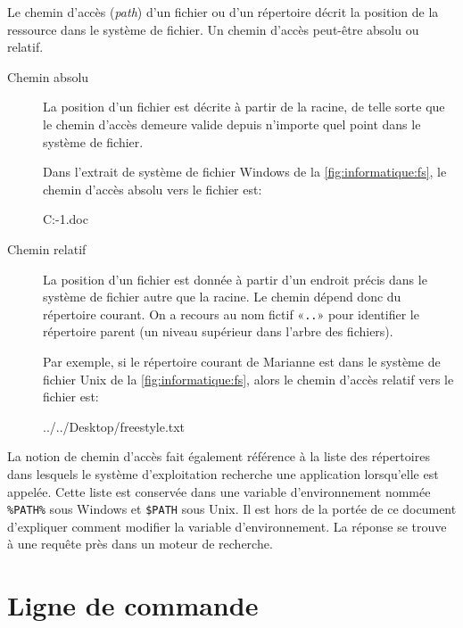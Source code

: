 Le chemin d'accès (\emph{path}) d'un fichier ou
d'un répertoire décrit la position de la ressource dans le système de
fichier. Un chemin d'accès peut-être absolu ou relatif.
\begin{description}
\item[Chemin absolu]  La position d'un
  fichier est décrite à partir de la racine, de telle sorte que le
  chemin d'accès demeure valide depuis n'importe quel point dans le
  système de fichier.

  Dans l'extrait de système de fichier Windows de la
  \autoref{fig:informatique:fs}, le chemin d'accès absolu vers le
  fichier  est:
\begin{Schunk}
\begin{Sinput}
C:\Users\Alexandre\Documents\synthese-1.doc
\end{Sinput}
\end{Schunk}
\item[Chemin relatif]  La position d'un
  fichier est donnée à partir d'un endroit précis dans le système de
  fichier autre que la racine. Le chemin dépend donc du répertoire
  courant. On a recours au nom fictif «\verb=..=» pour identifier le
  répertoire parent (un niveau supérieur dans l'arbre des fichiers).

  Par exemple, si le répertoire courant de Marianne est
   dans le système de fichier Unix de la
  \autoref{fig:informatique:fs}, alors le chemin d'accès relatif vers
  le fichier  est:
\begin{Schunk}
\begin{Sinput}
../../Desktop/freestyle.txt
\end{Sinput}
\end{Schunk}
\end{description}

La notion de chemin d'accès fait également référence à la liste des
répertoires dans lesquels le système d'exploitation recherche une
application lorsqu'elle est appelée. Cette liste est conservée dans
une variable d'environnement nommée \verb=%PATH%= sous Windows
et \verb=$PATH= sous Unix. Il est hors de la portée de ce document
d'expliquer comment modifier la variable d'environnement. La réponse
se trouve à une requête près dans un moteur de recherche.


\section{Ligne de commande}
\label{sec:informatique:cli}

